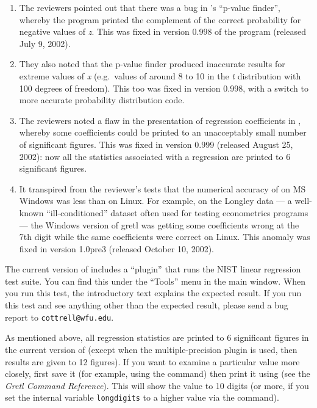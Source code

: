 \begin{enumerate}
\item The reviewers pointed out that there was a bug in 's
  ``p-value finder'', whereby the program printed the complement of
  the correct probability for negative values of \emph{z}.  This was
  fixed in version 0.998 of the program (released July 9, 2002).
\item They also noted that the p-value finder produced inaccurate
  results for extreme values of \emph{x} (e.g.\ values of around 8 to
  10 in the \emph{t} distribution with 100 degrees of freedom).  This
  too was fixed in  version 0.998, with a switch to more
  accurate probability distribution code.
\item The reviewers noted a flaw in the presentation of regression
  coefficients in , whereby some coefficients could be
  printed to an unacceptably small number of significant figures.
  This was fixed in version 0.999 (released August 25, 2002): now all
  the statistics associated with a regression are printed to 6
  significant figures.
\item It transpired from the reviewer's tests that the numerical
  accuracy of  on MS Windows was less than on Linux.  For
  example, on the Longley data --- a well-known ``ill-conditioned''
  dataset often used for testing econometrics programs --- the Windows
  version of gretl was getting some coefficients wrong at the 7th
  digit while the same coefficients were correct on Linux.  This
  anomaly was fixed in  version 1.0pre3 (released October
  10, 2002).
\end{enumerate}

The current version of  includes a ``plugin'' that runs the
NIST linear regression test suite.  You can find this under the
``Tools'' menu in the main window.  When you run this test, the
introductory text explains the expected result.  If you run this test
and see anything other than the expected result, please send a bug
report to \verb+cottrell@wfu.edu+.  

As mentioned above, all regression statistics are printed to 6
significant figures in the current version of  (except when
the multiple-precision plugin is used, then results are given to 12
figures).  If you want to examine a particular value more closely,
first save it (for example, using the  command) then print
it using  (see the \emph{Gretl Command Reference}).
This will show the value to 10 digits (or more, if you set the
internal variable \texttt{longdigits} to a higher value via the
 command).

